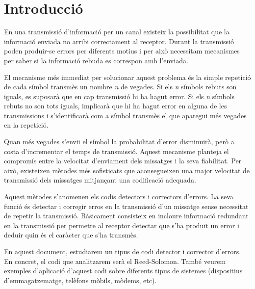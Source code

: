 \section{Introducció}
En una transmissió d'informació per un canal existeix la possibilitat que la
informació enviada no arribi correctament al receptor. Durant la transmissió
poden produir-se errors per diferents motius i per això necessitam
mecanismes per saber si la informació rebuda es correspon amb l'enviada. 

El mecanisme més immediat per solucionar aquest problema és la simple
repetició de cada símbol transmès un nombre \emph{n} de vegades. Si els \emph{n}
símbols rebuts son iguals, es suposarà que en cap transmissió hi ha hagut error.
Si els \emph{n} símbols rebuts no son tots iguals, implicarà que hi ha hagut
error en alguna de les transmissions i s'identificarà com a símbol transmès el
que aparegui més vegades en la repetició. 
 
Quan més vegades s'envii el símbol la probabilitat d'error disminuirà, però a
costa d'incrementar el temps de transmissió. Aquest mecanisme planteja el
compromís entre la velocitat d'enviament dels missatges i la seva fiabilitat.
Per això, existeixen mètodes més sofisticats que aconsegueixen una major
velocitat de transmissió dels missatges mitjançant una codificació adequada. 

Aquest mètodes s'anomenen els codis detectors i correctors d'errors. La seva
funció és detectar i corregir erros en la transmissió d'un missatge sense
necessitat de repetir la transmissió. Bàsicament consisteix en incloure
informació redundant en la transmissió per permetre al receptor detectar
que s'ha produït un error i deduir quin és el caràcter que s'ha transmès. 

En aquest document, estudiarem un tipus de codi detector i corrector d'errors.
En concret, el codi que analitzarem  serà el Reed-Solomon. També veurem
exemples d'aplicació d'aquest codi sobre diferents tipus de sistemes
(dispositius d'emmagatzematge, telèfons mòbils, mòdems, etc). 